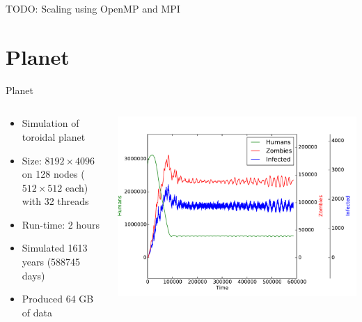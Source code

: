 \documentclass{beamer}
\newcommand{\todo}[1]{}
\renewcommand{\todo}[1]{{\color{red} TODO: {#1}}}
\begin{document}
\begin{frame}
    \todo{Scaling using OpenMP and MPI}
\end{frame}

\section{Planet}

\begin{frame}{Planet}
    \begin{columns}
        \begin{column}{0.4\textwidth}
            \begin{itemize}
                \item Simulation of toroidal planet
                \item Size: $8192 \times 4096$ on 128 nodes ($512 \times 512$ each) with 32 threads
                \item Run-time: 2 hours
                \item Simulated 1613 years (588745 days)
                \item Produced 64 GB of data
            \end{itemize}
        \end{column}
        \begin{column}{0.6\textwidth}
            \includegraphics[width=\textwidth]{torus/planet.pdf}
        \end{column}
    \end{columns}
\end{frame}
\end{document}
